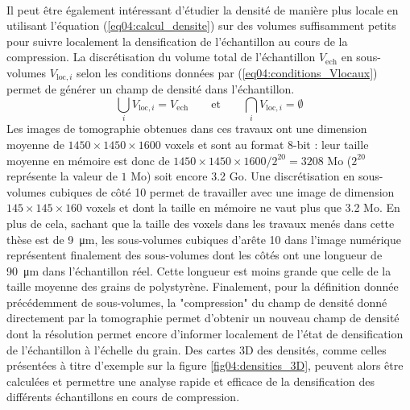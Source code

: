 		\paragraph{}
		Il peut être également intéressant d'étudier la densité de manière plus locale en utilisant l'équation (\ref{eq04:calcul_densite}) sur des volumes suffisamment petits pour suivre localement la densification de l'échantillon au cours de la compression. La discrétisation du volume total de l'échantillon $V_\textrm{ech}$ en sous-volumes $V_{\textrm{loc},i}$ selon les conditions données par (\ref{eq04:conditions_Vlocaux}) permet de générer un champ de densité dans l'échantillon.
		\begin{equation}\label{eq04:conditions_Vlocaux}
			\bigcup_i V_{\textrm{loc},i} = V_\textrm{ech}
			\qquad\text{et}\qquad
			\bigcap_i V_{\textrm{loc},i} = \emptyset
		\end{equation}
		Les images de tomographie obtenues dans ces travaux ont une dimension moyenne de $1450 \times 1450 \times 1600$ voxels et sont au format 8-bit : leur taille moyenne en mémoire est donc de $1450 \times 1450 \times 1600 / 2^{20} = 3208$ Mo ($2^{20}$ représente la valeur de $1$ Mo) soit encore \num{3.2} Go. Une discrétisation en sous-volumes cubiques de côté \SI{10}{\voxel} permet de travailler avec une image de dimension $145 \times 145 \times 160$ voxels et dont la taille en mémoire ne vaut plus que \num{3.2} Mo. En plus de cela, sachant que la taille des voxels dans les travaux menés dans cette thèse est de \SI{9}{\micro\meter}, les sous-volumes cubiques d'arête \SI{10}{\voxel} dans l'image numérique représentent finalement des sous-volumes dont les côtés ont une longueur de \SI{90}{\micro\meter} dans l'échantillon réel. Cette longueur est moins grande que celle de la taille moyenne des grains de polystyrène. Finalement, pour la définition donnée précédemment de sous-volumes, la "compression" du champ de densité donné directement par la tomographie permet d'obtenir un nouveau champ de densité dont la résolution permet encore d'informer localement de l'état de densification de l'échantillon à l'échelle du grain. Des cartes 3D des densités, comme celles présentées à titre d'exemple sur la figure \ref{fig04:densities_3D}, peuvent alors être calculées et permettre une analyse rapide et efficace de la densification des différents échantillons en cours de compression.
